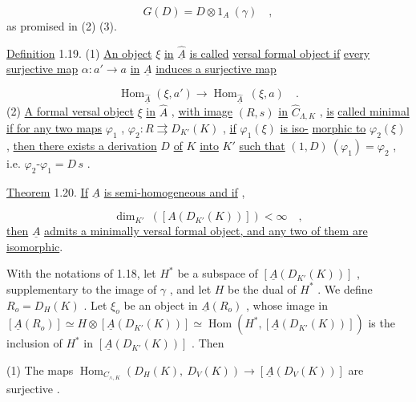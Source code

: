\begin{equation*}
G(D) = D \otimes 1_{A}\ (\gamma) \quad ,
\end{equation*}
as promised in (2) (3).

\underline{Definition} 1.19.   (1) \underline{An object}  $\xi$  \underline{in}  $\widehat{\underline{A}}$  \underline{is called}   \underline{versal formal object if} \underline{every surjective map}  $\alpha : a' \longrightarrow a$  \underline{in}  $\underline{A}$  \underline{induces a surjective map}

\begin{equation*}
\operatorname{Hom}_{\widehat{\underline{A}}}(\xi, a') \longrightarrow \operatorname{Hom}_{\widehat{\underline{A}}}\ (\xi, a) \quad .
\end{equation*}
(2)   \underline{A formal versal object}  $\xi$  \underline{in}  $\widehat{A}$  , \underline{with image}  $(R, s)$  \underline{in}  $\widehat{C}_{\Lambda,K}$  , \underline{is} \underline{called  minimal  if for any two maps}  $\varphi_{1}$ , $\varphi_{2} : R \rightrightarrows D_{K'}(K)$  , \underline{if}  $\varphi_{1}(\xi)$  \underline{is iso-} \underline{morphic to}  $\varphi_{2}(\xi)$  , \underline{then there exists a derivation}  $D$  \underline{of}  $K$  \underline{into}  $K'$  \underline{such that}  $(1, D)\ (\varphi_{1}) = \varphi_{2}$  , i.e.  $\varphi_{2}\text{-}\varphi_{1} = D\,s$  .

\underline{Theorem} 1.20.   \underline{If}  $\underline{A}$  \underline{is semi-homogeneous and if}  ,

\begin{equation*}
\dim_{K'}\ ([A(D_{K'}(K))]) < \infty \quad ,
\end{equation*}
\underline{then}  $\underline{A}$  \underline{admits a minimally versal formal object, and any two of them are}
\underline{isomorphic}.

With the notations of 1.18, let  $H^*$  be a subspace of  $[\underline{A}(D_{K'}(K))]$ , supplementary to the image of  $\gamma$ , and let  $H$  be the dual of  $H^*$ . We define $R_o = D_H(K)$ . Let  $\xi_o$  be an object in  $\underline{A}(R_o)$ , whose image in $[\underline{A}(R_o)] \simeq H \otimes [\underline{A}(D_{K'}(K))] \simeq \operatorname{Hom}(H^*,[\underline{A}(D_{K'}(K))])$  is the inclusion of  $H^*$  in $[\underline{A}(D_{K'}(K))]$ . Then

(1)  The maps  $\operatorname{Hom}_{C_{\wedge,K}}(D_H(K),\ D_V(K)) \longrightarrow [\underline{A}(D_V(K))]$  are surjective .

